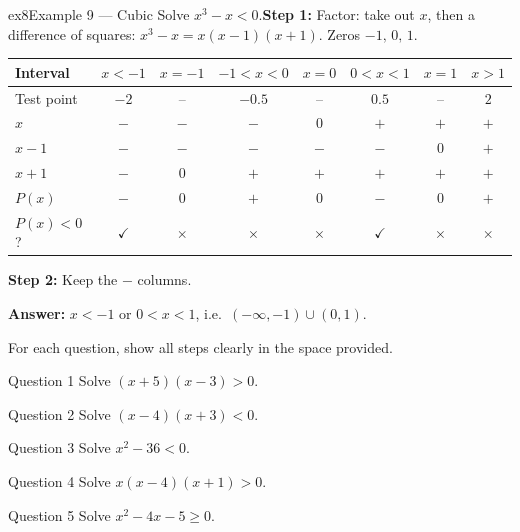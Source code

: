 \documentclass[11pt]{article}
\begin{document}
\begin{example}{ex8}{Example 9 --- Cubic}
Solve $x^3-x<0$.\soln \textbf{Step 1:} Factor: take out $x$, then a difference of squares: $x^3-x=x(x-1)(x+1)$. Zeros $-1,\,0,\,1$.\begin{center}\small\setlength{\tabcolsep}{4pt}\renewcommand{\arraystretch}{1.2}
\begin{tabular}{l|ccccccc}
\hline
Interval & $x<-1$ & $x=-1$ & $-1<x<0$ & $x=0$ & $0<x<1$ & $x=1$ & $x>1$ \\ \hline
Test point & $-2$ & -- & $-0.5$ & -- & $0.5$ & -- & $2$ \\ \hline
$x$ & $-$ & $-$ & $-$ & $0$ & $+$ & $+$ & $+$ \\
$x-1$ & $-$ & $-$ & $-$ & $-$ & $-$ & $0$ & $+$ \\
$x+1$ & $-$ & $0$ & $+$ & $+$ & $+$ & $+$ & $+$ \\
\hline
$P(x)$ & $-$ & $0$ & $+$ & $0$ & $-$ & $0$ & $+$ \\ \hline
$P(x)<0$? & $\checkmark$ & $\times$ & $\times$ & $\times$ & $\checkmark$ & $\times$ & $\times$ \\ \hline
\end{tabular}\end{center}\textbf{Step 2:} Keep the $-$ columns.

\textbf{Answer:} $x<-1\text{ or }0<x<1$, i.e.\ $(-\infty,-1)\cup(0,1)$.
\end{example}

\clearpage
{}
For each question, show all steps clearly in the space provided.

\begin{qbox}{Question 1}
Solve $(x+5)(x-3)>0$.\workspace{2.4cm}
\end{qbox}

\begin{qbox}{Question 2}
Solve $(x-4)(x+3)<0$.\workspace{2.4cm}
\end{qbox}

\begin{qbox}{Question 3}
Solve $x^2-36<0$.\workspace{2.4cm}
\end{qbox}

\begin{qbox}{Question 4}
Solve $x(x-4)(x+1)>0$.\workspace{2.4cm}
\end{qbox}

\begin{qbox}{Question 5}
Solve $x^2-4x-5\ge0$.\workspace{2.4cm}
\end{qbox}
\end{document}
